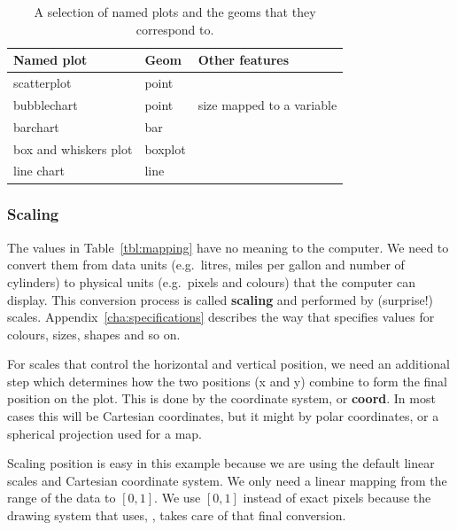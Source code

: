 \begin{table}
  \begin{center}
  \begin{tabular}{lll}
    \toprule 
    Named plot & Geom & Other features \\
    \midrule
    scatterplot & point &  \\
    bubblechart & point & size mapped to a variable \\ 
    barchart & bar &  \\
    box and whiskers plot & boxplot &  \\
    line chart & line &  \\     
    \bottomrule
  \end{tabular}
  \end{center}
  \caption{A selection of named plots and the geoms that they correspond to.}
  \label{tbl:named-plots}
\end{table}

% 


\subsubsection{Scaling} 

The values in Table~\ref{tbl:mapping} have no meaning to the computer.  We need to convert them from data units (e.g.\ litres, miles per gallon and number of cylinders) to physical units (e.g.\ pixels and colours) that the computer can display.  This conversion process is called {\bf scaling} and performed by (surprise!) scales.   Appendix~\ref{cha:specifications} describes the way that specifies values for colours, sizes, shapes and so on.

For scales that control the horizontal and vertical position, we need an additional step which determines how the two positions (x and y) combine to form the final position on the plot.  This is done by the coordinate system, or {\bf coord}.  In most cases this will be Cartesian coordinates, but it might by polar coordinates, or a spherical projection used for a map.

Scaling position is easy in this example because we are using the default  linear scales and Cartesian coordinate system.  We only need a linear mapping from the range of the data to $[0, 1]$.  We use $[0, 1]$ instead of exact pixels because the drawing system that \ggplot uses, , takes care of that final conversion. 

